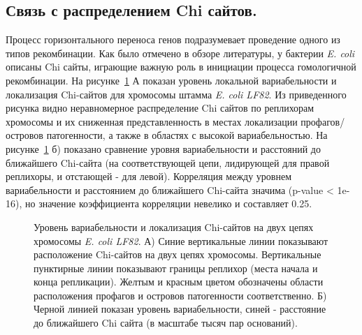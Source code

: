 \subsection{Связь с распределением Chi сайтов.}
Процесс горизонтального переноса генов подразумевает проведение одного из типов рекомбинации. Как было отмечено в обзоре литературы, у бактерии \textit{E. coli} описаны Chi сайты, играющие важную роль в инициации процесса гомологичной рекомбинации. 
На рисунке~\ref{img:chi_lf82} А показан уровень локальной вариабельности и локализация Chi-сайтов для хромосомы штамма \textit{E. coli LF82}. Из приведенного рисунка видно неравномерное распределение Chi сайтов по реплихорам хромосомы и их сниженная представленность в местах локализации профагов/островов патогенности, а также в областях с высокой вариабельностью. На рисунке~\ref{img:chi_lf82} б) показано сравнение уровня вариабельности и расстояний до ближайшего Chi-сайта (на соответствующей цепи, лидирующей для правой реплихоры, и отстающей - для левой). Корреляция между уровнем вариабельности и расстоянием до ближайшего Chi-сайта значима (p-value < 1e-16), но значение коэффициента корреляции невелико и составляет 0.25.
\begin{figure}[!ht] 
  \center
    
    
    \caption{Уровень вариабельности и локализация Chi-сайтов на двух цепях хромосомы \textit{E. coli LF82}. А) Синие вертикальные линии показывают расположение Chi-сайтов на двух цепях хромосомы. Вертикальные пунктирные линии показывают границы реплихор (места начала и конца репликации). Желтым и красным цветом обозначены области расположения профагов и островов патогенности соответственно. Б) Черной линией показан уровень вариабельности, синей - расстояние до ближайшего Chi сайта (в масштабе тысяч пар оснований).}
    \label{img:chi_lf82}
\end{figure}


